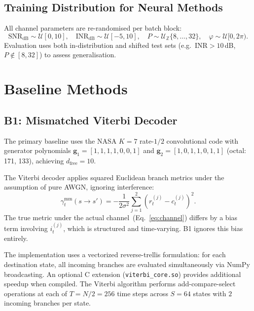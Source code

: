 \documentclass[11pt,a4paper]{article}
\newcommand{\snr}{\text{SNR}}
\newcommand{\inr}{\text{INR}}
\newcommand{\dfree}{d_{\text{free}}}
\begin{document}
\subsection{Training Distribution for Neural Methods}

All channel parameters are re-randomised per batch block:
\begin{equation}
  \snr_{\text{dB}} \sim \mathcal{U}[0, 10],\quad
  \inr_{\text{dB}} \sim \mathcal{U}[-5, 10],\quad
  P \sim \mathcal{U}_{\mathbb{Z}}\{8,\ldots,32\},\quad
  \varphi \sim \mathcal{U}[0, 2\pi).
\end{equation}
Evaluation uses both in-distribution and shifted test sets (e.g.\ $\inr > 10$\,dB, $P \notin [8,32]$) to assess generalisation.

\section{Baseline Methods}

\subsection{B1: Mismatched Viterbi Decoder}

The primary baseline uses the NASA $K=7$ rate-$1/2$ convolutional code with generator polynomials $\mathbf{g}_1 = [1,1,1,1,0,0,1]$ and $\mathbf{g}_2 = [1,0,1,1,0,1,1]$ (octal: 171, 133), achieving $\dfree = 10$.

The Viterbi decoder applies squared Euclidean branch metrics under the assumption of pure AWGN, ignoring interference:
\begin{equation}
  \gamma_t^{\text{mm}}(s \to s')
  = -\frac{1}{2\sigma^2}\sum_{j=1}^{2}\!\left(r_t^{(j)} - c_t^{(j)}\right)^2.
  \label{eq:mm_bm}
\end{equation}
The true metric under the actual channel~(Eq.~\ref{eq:channel}) differs by a bias term involving $i_t^{(j)}$, which is structured and time-varying. B1 ignores this bias entirely.

The implementation uses a vectorized reverse-trellis formulation: for each destination state, all incoming branches are evaluated simultaneously via NumPy broadcasting. An optional C extension (\texttt{viterbi\_core.so}) provides additional speedup when compiled. The Viterbi algorithm performs add-compare-select operations at each of $T = N/2 = 256$ time steps across $S = 64$ states with $2$ incoming branches per state.
\end{document}
